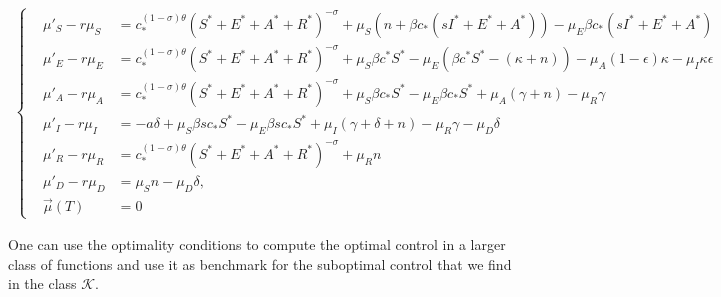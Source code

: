 \documentclass{amsart}
\begin{document}
\begin{align*}
  \left\{\begin{array}{rcl}
&\mu'_S-r\mu_S&=c_*^{(1-\sigma)\theta}(S^*+E^*+A^*+R^*)^{-\sigma}+\mu_S( n+\beta c_*(sI^*+E^*+A^*))
-\mu_E\beta c_*(sI^*+E^*+A^*)\\
&\mu'_E-r\mu_E&=c_*^{(1-\sigma)\theta}(S^*+E^*+A^*+R^*)^{-\sigma}+\mu_S\beta c^*S^*-\mu_E(\beta c^*S^*-(\kappa+n))-\mu_A(1-\epsilon)\kappa-\mu_I\kappa\epsilon\\
&\mu'_A-r\mu_A&=c_*^{(1-\sigma)\theta}(S^*+E^*+A^*+R^*)^{-\sigma}+\mu_S\beta c_*S^*-\mu_E\beta c_*S^*+\mu_A(\gamma+n)-\mu_R\gamma\\
&\mu'_I-r\mu_I&=-a\delta+\mu_S\beta s c_*S^*-\mu_E\beta s c_*S^*+\mu_I(\gamma+\delta+n)-\mu_R\gamma-\mu_D\delta\\
&\mu'_R-r\mu_R&=c_*^{(1-\sigma)\theta}(S^*+E^*+A^*+R^*)^{-\sigma}+\mu_Rn\\
&\mu'_D-r\mu_D&=\mu_Sn-\mu_D\delta,\\
&\vec{\mu}(T)&=0
\end{array}
\right.
\end{align*}

One can use the optimality conditions to compute the optimal control in a larger class of functions and use it as benchmark for the suboptimal control that we find in the class $\mathcal{K}$.
\end{document}
